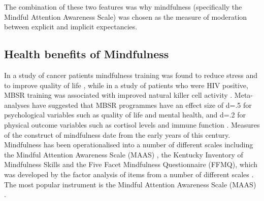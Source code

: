 \documentclass{article}
\begin{document}
The combination of these two features was why mindfulness (specifically the Mindful Attention Awareness Scale) was chosen as the measure of moderation between explicit and implicit expectancies. 

\subsection{Health benefits of Mindfulness}
\label{sec:health-benef-mindf}



In a study of cancer patients mindfulness training was found to reduce stress and to improve quality of life \cite{Carlson2007}, 
while in a study of patients who were HIV positive, MBSR training was associated with improved natural killer cell activity 
\cite{Robinson2003}. Meta-analyses have suggested that MBSR programmes have an effect size of d=.5 for psychological variables 
such as quality of life and mental health, and d=.2 for physical outcome variables such as cortisol levels and immune function \cite{Grossman2004}.
Measures of the construct of mindfulness date from the early years of this century. Mindfulness has been operationalised 
into a number of different scales including the Mindful Attention Awareness Scale (MAAS) \cite{brown2003benefits} , 
the Kentucky Inventory of Mindfulness Skills \cite{Ruth2004} and the Five Facet Mindfulness Questionnaire (FFMQ), 
which was developed by the factor analysis of items from a number of different scales \cite{Ruth2006}. The most popular instrument is
 the Mindful Attention Awareness Scale (MAAS) \cite{brown2003benefits}.
\end{document}
